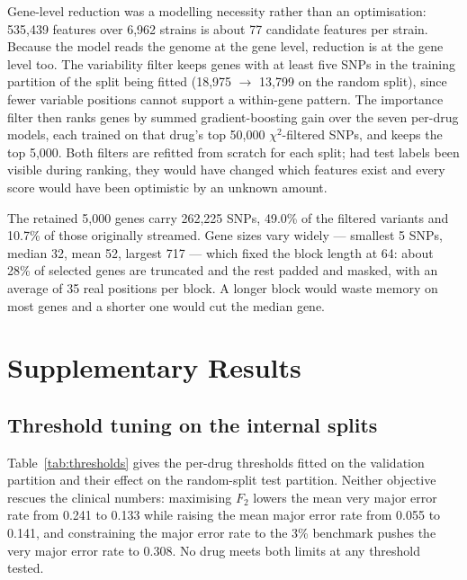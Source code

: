 \documentclass[11pt]{article}
\begin{document}
Gene-level reduction was a modelling necessity rather than an optimisation: 535,439 features over
6,962 strains is about 77 candidate features per strain. Because the model reads the genome at the
gene level, reduction is at the gene level too. The variability filter keeps genes with at least
five SNPs in the training partition of the split being fitted (18,975 $\rightarrow$ 13,799 on the
random split), since fewer variable positions cannot support a within-gene pattern. The importance
filter then ranks genes by summed gradient-boosting gain over the seven per-drug models, each
trained on that drug's top 50,000 $\chi^2$-filtered SNPs, and keeps the top 5,000. Both filters are
refitted from scratch for each split; had test labels been visible during ranking, they would have
changed which features exist and every score would have been optimistic by an unknown amount.

The retained 5,000 genes carry 262,225 SNPs, 49.0\% of the filtered variants and 10.7\% of those
originally streamed. Gene sizes vary widely --- smallest 5 SNPs, median 32, mean 52, largest 717 ---
which fixed the block length at 64: about 28\% of selected genes are truncated and the rest padded
and masked, with an average of 35 real positions per block. A longer block would waste memory on
most genes and a shorter one would cut the median gene.

\section{Supplementary Results}

\subsection{Threshold tuning on the internal splits}
Table~\ref{tab:thresholds} gives the per-drug thresholds fitted on the validation partition and
their effect on the random-split test partition. Neither objective rescues the clinical numbers:
maximising $F_2$ lowers the mean very major error rate from 0.241 to 0.133 while raising the mean
major error rate from 0.055 to 0.141, and constraining the major error rate to the 3\% benchmark
pushes the very major error rate to 0.308. No drug meets both limits at any threshold tested.
\end{document}
